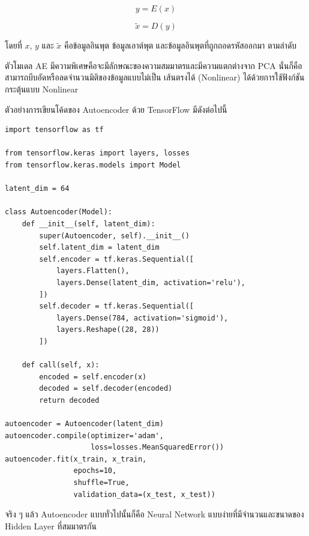 \begin{equation}\label{eq:encoder}
    y = E(x)
\end{equation}

\begin{equation}
    \tilde{x} = D(y)
\end{equation}

\noindent โดยที่ $x$, $y$ และ $\tilde{x}$ คือข้อมูลอินพุต ข้อมูลเอาต์พุต และข้อมูลอินพุตที่ถูกถอดรหัสออกมา ตามลำดับ

ตัวโมเดล AE มีความพิเศษคือจะมีลักษณะของความสมมาตรและมีความแตกต่างจาก PCA นั่นก็คือสามารถบีบอัดหรือลดจำนวนมิติของข้อมูลแบบไม่เป็น%
เส้นตรงได้ (Nonlinear) ได้ด้วยการใช้ฟังก์ชันกระตุ้นแบบ Nonlinear

ตัวอย่างการเขียนโค้ดของ Autoencoder ด้วย TensorFlow มีดังต่อไปนี้

\begin{lstlisting}[style=MyPython]
import tensorflow as tf

from tensorflow.keras import layers, losses
from tensorflow.keras.models import Model

latent_dim = 64 

class Autoencoder(Model):
    def __init__(self, latent_dim):
        super(Autoencoder, self).__init__()
        self.latent_dim = latent_dim   
        self.encoder = tf.keras.Sequential([
            layers.Flatten(),
            layers.Dense(latent_dim, activation='relu'),
        ])
        self.decoder = tf.keras.Sequential([
            layers.Dense(784, activation='sigmoid'),
            layers.Reshape((28, 28))
        ])

    def call(self, x):
        encoded = self.encoder(x)
        decoded = self.decoder(encoded)
        return decoded

autoencoder = Autoencoder(latent_dim)
autoencoder.compile(optimizer='adam', 
                    loss=losses.MeanSquaredError())
autoencoder.fit(x_train, x_train,
                epochs=10,
                shuffle=True,
                validation_data=(x_test, x_test))
\end{lstlisting}

\noindent จริง ๆ แล้ว Autoencoder แบบทั่วไปนั้นก็คือ Neural Network แบบง่ายที่มีจำนวนและขนาดของ Hidden Layer ที่สมมาตรกัน
